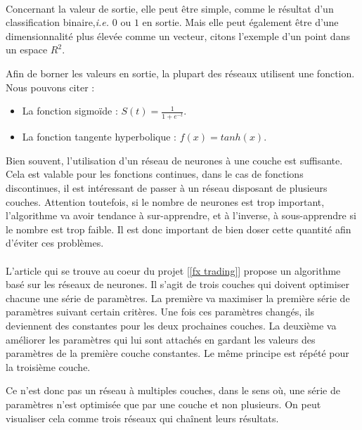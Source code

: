 \documentclass[a4paper, 11pt]{article}
\begin{document}

\paragraph{}
Concernant la valeur de sortie, elle peut être simple, comme le résultat d'un classification binaire,\textit{i.e.} $0$ ou $1$ en sortie. Mais elle peut également être d'une dimensionnalité plus élevée comme un vecteur, citons l'exemple d'un point dans un espace $R^2$.

Afin de borner les valeurs en sortie, la plupart des réseaux utilisent une fonction. Nous pouvons citer :
\begin{itemize}
\item La fonction sigmoïde : $S(t) = \frac{1}{1 + e^{-t}}$.
\item La fonction tangente hyperbolique : $f(x) = tanh(x)$.
\end{itemize}

Bien souvent, l'utilisation d'un réseau de neurones à une couche est suffisante. Cela est valable pour les fonctions continues, dans le cas de fonctions discontinues, il est intéressant de passer à un réseau disposant de plusieurs couches. Attention toutefois, si le nombre de neurones est trop important, l'algorithme va avoir tendance à sur-apprendre, et à l'inverse, à sous-apprendre si le nombre est trop faible. Il est donc important de bien doser cette quantité afin d'éviter ces problèmes.

\paragraph{}
L'article qui se trouve au coeur du projet [\ref{fx trading}] propose un algorithme basé sur les réseaux de neurones. Il s'agit de trois couches qui doivent optimiser chacune une série de paramètres. La première va maximiser la première série de paramètres suivant certain critères. Une fois ces paramètres changés, ils deviennent des constantes pour les deux prochaines couches. La deuxième va améliorer les paramètres qui lui sont attachés en gardant les valeurs des paramètres de la première couche constantes. Le même principe est répété pour la troisième couche.

Ce n'est donc pas un réseau à multiples couches, dans le sens où, une série de paramètres n'est optimisée que par une couche et non plusieurs. On peut visualiser cela comme trois réseaux qui chaînent leurs résultats.
\end{document}
